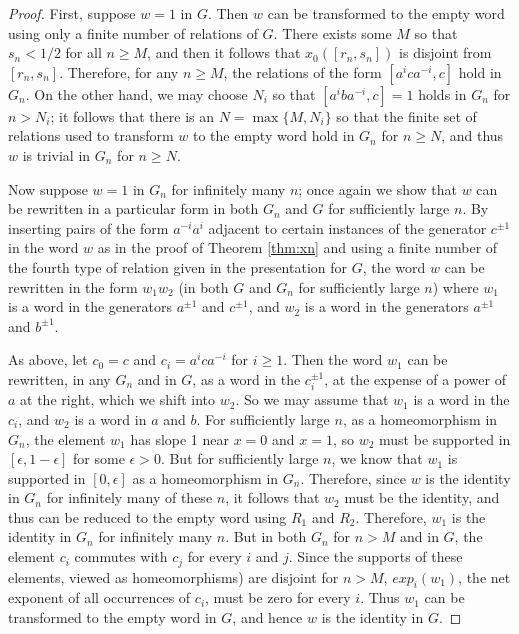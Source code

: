 \documentclass[11pt]{amsart}
\begin{document}
\begin{proof}
First, suppose $w=1$ in $G$. Then $w$ can be transformed to the
empty word using only a finite number of relations of $G$. There exists
some $M$ so that $s_n < 1/2$ for all $n \geq M$, and then it
follows that $x_0([r_n,s_n])$ is disjoint from $[r_n,s_n]$.
Therefore, for any $n \geq M$, the relations of the form
$[a^ica^{-i},c]$ hold in $G_n$. On the other hand, we may choose $N_i$ so that $[a^i b
a^{-i},c]=1$ holds in $G_n$ for $n>N_i$; it follows that there is an $N = \max \{M,N_i\}$ so that the finite set of relations used to transform $w$ to the empty word hold in $G_n$ for $n \geq N$, and thus $w$
is trivial in $G_n$ for $n \geq N$.

Now suppose $w=1$ in $G_n$ for infinitely many
$n$; once again we show that $w$ can be rewritten in a particular form in both $G_n$ and $G$ for sufficiently large $n$. By inserting pairs of the form $a^{-i}a^i$ adjacent to certain instances of the generator $c^{\pm 1}$ in the
word $w$ as in the proof of Theorem \ref{thm:xn} and using a finite number of the fourth type of relation given in the presentation for $G$, the word
$w$ can be rewritten in the form
$w_1w_2$ (in both $G$ and $G_n$ for sufficiently large $n$) where $w_1$ is a word in the generators $a^{\pm 1}$ and $c^{\pm 1}$, and $w_2$ is a
word in the generators $a^{\pm 1}$ and $b^{\pm 1}$.

As above, let $c_0=c$ and $c_i=a^i c a^{-i}$ for $i \geq 1$. Then the word $w_1$ can be rewritten, in any $G_n$ and in $G$, as a word in the $c_i^{\pm 1}$, at the expense of a power of $a$ at the
right, which we shift into $w_2$. So we may assume that $w_1$ is a word
in the $c_i$, and $w_2$ is a word in $a$ and $b$. For sufficiently large
$n$, as a homeomorphism in $G_n$, the element $w_1$ has slope 1 near $x=0$
and $x=1$, so $w_2$ must be supported in $[\epsilon, 1-\epsilon]$
for some $\epsilon > 0$. But for sufficiently large $n$, we know that $w_1$
is supported in $[0,\epsilon]$ as a homeomorphism in $G_n$.
Therefore, since $w$ is the identity in $G_n$ for infinitely many of these $n$, it follows that $w_2$ must be the identity, and thus can be
reduced to the empty word using $R_1$ and $R_2$. Therefore, $w_1$
is the identity in $G_n$ for infinitely many $n$. But in both $G_n$ for $n>M$ and
in $G$, the element $c_i$ commutes with $c_j$ for every $i$ and $j$. Since the
supports of these elements, viewed as homeomorphisms) are disjoint for $n>M$, $exp_{i}(w_1)$, the net exponent of all
occurrences of $c_i$, must be zero for every $i$. Thus $w_1$ can
be transformed to the empty word in $G$, and hence $w$ is the identity in $G$.
\end{proof}
\end{document}
